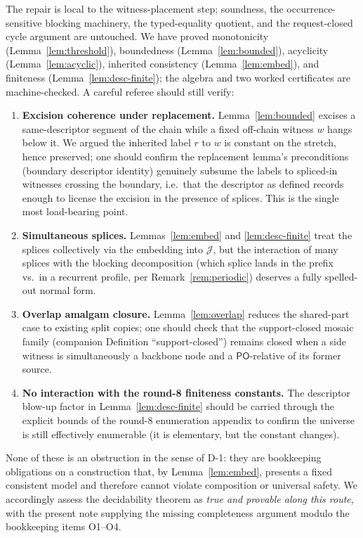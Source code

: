 \documentclass[11pt]{article}
\newcommand{\PO}{\mathsf{PO}}
\newcommand{\J}{\mathcal J}
\begin{document}
The repair is local to the witness-placement step; soundness, the
occurrence-sensitive blocking machinery, the typed-equality quotient, and the
request-closed cycle argument are untouched.  We have proved monotonicity
(Lemma~\ref{lem:threshold}), boundedness (Lemma~\ref{lem:bounded}), acyclicity
(Lemma~\ref{lem:acyclic}), inherited consistency (Lemma~\ref{lem:embed}), and
finiteness (Lemma~\ref{lem:desc-finite}); the algebra and two worked
certificates are machine-checked.  A careful referee should still verify:

\begin{enumerate}[label=O\arabic*.]
\item \textbf{Excision coherence under replacement.}  Lemma~\ref{lem:bounded}
excises a same-descriptor segment of the chain while a fixed off-chain witness
$w$ hangs below it.  We argued the inherited label $r$ to $w$ is constant on the
stretch, hence preserved; one should confirm the replacement lemma's
preconditions (boundary descriptor identity) genuinely subsume the labels to
spliced-in witnesses crossing the boundary, i.e.\ that the descriptor as defined
records enough to license the excision in the presence of splices.  This is the
single most load-bearing point.

\item \textbf{Simultaneous splices.}  Lemmas~\ref{lem:embed} and
\ref{lem:desc-finite} treat the splices collectively via the embedding into
$\J$, but the interaction of many splices with the blocking decomposition (which
splice lands in the prefix vs.\ in a recurrent profile, per
Remark~\ref{rem:periodic}) deserves a fully spelled-out normal form.

\item \textbf{Overlap amalgam closure.}  Lemma~\ref{lem:overlap} reduces the
shared-part case to existing split copies; one should check that the
support-closed mosaic family (companion Definition ``support-closed'') remains
closed when a side witness is simultaneously a backbone node and a $\PO$-relative
of its former source.

\item \textbf{No interaction with the round-8 finiteness constants.}  The
descriptor blow-up factor in Lemma~\ref{lem:desc-finite} should be carried
through the explicit bounds of the round-8 enumeration appendix to confirm the
universe is still effectively enumerable (it is elementary, but the constant
changes).
\end{enumerate}

None of these is an obstruction in the sense of D-1: they are bookkeeping
obligations on a construction that, by Lemma~\ref{lem:embed}, presents a fixed
consistent model and therefore cannot violate composition or universal safety.
We accordingly assess the decidability theorem as \emph{true and provable along
this route}, with the present note supplying the missing completeness argument
modulo the bookkeeping items O1--O4.
\end{document}
